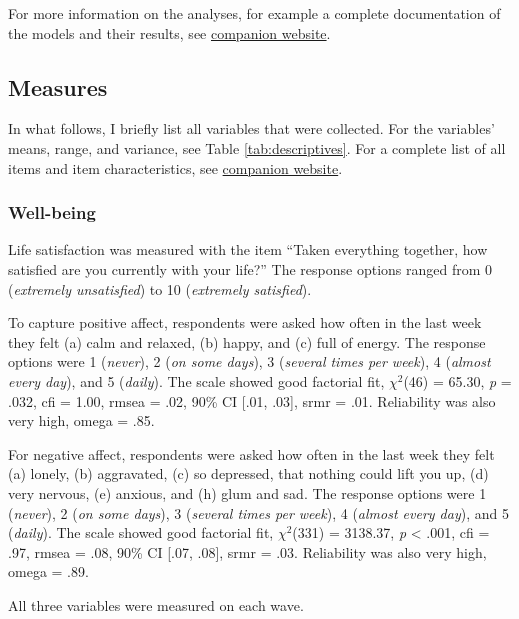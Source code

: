 \documentclass[
  english,
  man,mask,floatsintext]{apa6}
\begin{document}
For more information on the analyses, for example a complete documentation of the models and their results, see \href{https://xmtra.github.io/Austrian_Corona_Panel_Project/index.html}{companion website}.

\hypertarget{measures}{%
\subsection{Measures}\label{measures}}

In what follows, I briefly list all variables that were collected.
For the variables' means, range, and variance, see Table \ref{tab:descriptives}.
For a complete list of all items and item characteristics, see \href{https://xmtra.github.io/Austrian_Corona_Panel_Project/index.html}{companion website}.

\hypertarget{well-being}{%
\subsubsection{Well-being}\label{well-being}}

Life satisfaction was measured with the item ``Taken everything together, how satisfied are you currently with your life?''
The response options ranged from 0 (\emph{extremely unsatisfied}) to 10 (\emph{extremely satisfied}).

To capture positive affect, respondents were asked how often in the last week they felt (a) calm and relaxed, (b) happy, and (c) full of energy.
The response options were 1 (\emph{never}), 2 (\emph{on some days}), 3 (\emph{several times per week}), 4 (\emph{almost every day}), and 5 (\emph{daily}).
The scale showed good factorial fit, \(\chi^2\)(46) = 65.30, \textit{p} = .032, cfi = 1.00, rmsea = .02, 90\% CI {[}.01, .03{]}, srmr = .01.
Reliability was also very high, omega = .85.

For negative affect, respondents were asked how often in the last week they felt (a) lonely, (b) aggravated, (c) so depressed, that nothing could lift you up, (d) very nervous, (e) anxious, and (h) glum and sad.
The response options were 1 (\emph{never}), 2 (\emph{on some days}), 3 (\emph{several times per week}), 4 (\emph{almost every day}), and 5 (\emph{daily}).
The scale showed good factorial fit, \(\chi^2\)(331) = 3138.37, \textit{p} \textless{} .001, cfi = .97, rmsea = .08, 90\% CI {[}.07, .08{]}, srmr = .03.
Reliability was also very high, omega = .89.

All three variables were measured on each wave.
\end{document}
